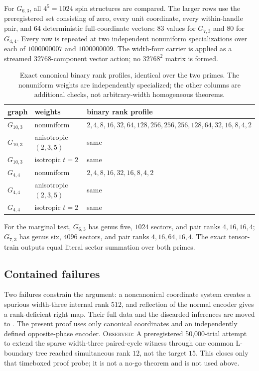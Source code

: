 \documentclass[11pt]{article}
\newcommand{\claimtag}[1]{\textsc{#1}}
\newcommand{\observed}{\claimtag{Observed}}
\begin{document}


For \(G_{6,3}\), all \(4^5=1024\) spin structures are compared.  The larger
rows use the preregistered set consisting of zero, every unit coordinate,
every within-handle pair, and 64 deterministic full-coordinate vectors:
83 values for \(G_{7,3}\) and 80 for \(G_{4,4}\).  Every row is repeated at
two independent nonuniform specializations over each of
\(1000000007\) and \(1000000009\).  The width-four carrier is applied as a
streamed \(32768\)-component vector action; no \(32768^2\) matrix is formed.

\begin{table}[ht]
\centering
\caption{Exact canonical binary rank profiles, identical over the two
primes.  The nonuniform weights are independently specialized; the other
columns are additional checks, not arbitrary-width homogeneous theorems.}
\label{tab:ranks}
\small
\begin{tabular}{@{}lll@{}}
\toprule
graph & weights & binary rank profile\\
\midrule
\(G_{10,3}\) & nonuniform &
\(2,4,8,16,32,64,128,256,256,256,128,64,32,16,8,4,2\)\\
\(G_{10,3}\) & anisotropic \((2,3,5)\) & same\\
\(G_{10,3}\) & isotropic \(t=2\) & same\\
\(G_{4,4}\) & nonuniform & \(2,4,8,16,32,16,8,4,2\)\\
\(G_{4,4}\) & anisotropic \((2,3,5)\) & same\\
\(G_{4,4}\) & isotropic \(t=2\) & same\\
\bottomrule
\end{tabular}
\end{table}

For the marginal test, \(G_{6,3}\) has genus five, \(1024\) sectors, and
pair ranks \(4,16,16,4\); \(G_{7,3}\) has genus six, \(4096\) sectors, and
pair ranks \(4,16,64,16,4\).  The exact tensor-train outputs equal literal
sector summation over both primes.

\subsection{Contained failures}\label{sec:failure}

Two failures constrain the argument: a noncanonical coordinate system
creates a spurious width-three internal rank \(512\), and reflection of the
normal encoder gives a rank-deficient right map.  Their full data and the
discarded inferences are moved to
.  The present proof uses only canonical
coordinates and an independently defined opposite-phase encoder.
\observed: A preregistered 50,000-trial attempt to extend the sparse
width-three paired-cycle witness through one common L-boundary tree reached
simultaneous rank \(12\), not the target \(15\).  This closes only that
timeboxed proof probe; it is not a no-go theorem and is not used above.
\end{document}
